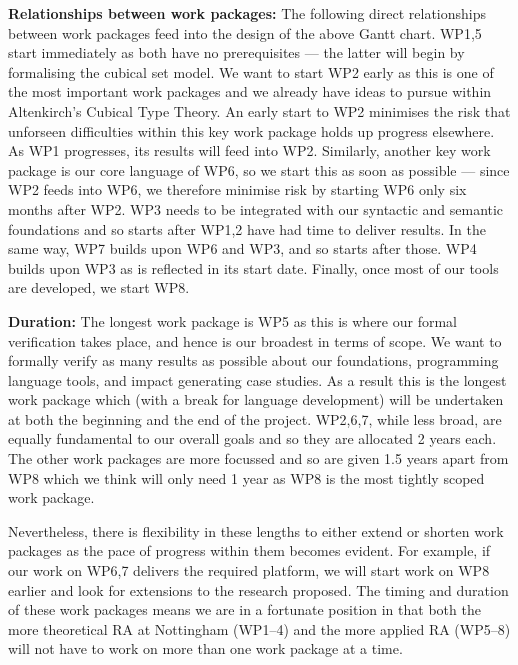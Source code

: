 \documentclass[a4paper,11pt]{article}
\begin{document}
\bigskip

{\bf Relationships between work packages:} The following direct
relationships between work packages feed into the design of the above
Gantt chart. WP1,5 start immediately as both have no prerequisites ---
the latter will begin by formalising the cubical set model. We want to
start WP2 early as this is one of the most important work packages and
we already have ideas to pursue within Altenkirch's Cubical Type
Theory. An early start to WP2 minimises the risk that unforseen
difficulties within this key work package holds
up progress elsewhere. As WP1 progresses, its results
will feed into WP2. Similarly, another key work package is our core
language of WP6, so we start this as soon as possible --- since WP2 feeds
into WP6, we therefore minimise risk by starting WP6 only six months after WP2. WP3 needs to be integrated with our syntactic
and semantic foundations and so starts after WP1,2 have had time to
deliver results.
In the same way, WP7 builds upon WP6 and WP3, and so starts
after those. %
WP4 builds upon WP3 as is reflected in
its start date. Finally, once most of our tools are developed, we
start WP8.  

{\bf Duration:} The longest work package is WP5 as this is where our
formal verification takes place, and hence is our broadest in terms of
scope. We want to formally verify as many results as possible about
our foundations, programming language tools, and impact generating
case studies.  As a result this is the longest work package which
(with a break for language development) will be undertaken at both the
beginning and the end of the project. WP2,6,7, while less broad, are
equally fundamental to our overall goals and so they are allocated 2
years each. The other work packages are more focussed and
so are given 1.5 years apart from WP8 which we think will only need 1
year as WP8 is the most tightly scoped work package.

Nevertheless, there is flexibility in these lengths to either extend
or shorten work packages as the pace of progress within them becomes
evident. For example, if our work on WP6,7 delivers the required
platform, we will start work on WP8 earlier and look for extensions
to the research proposed. The timing and duration of these work
packages means we are in a fortunate position in that both the more
theoretical RA at Nottingham (WP1--4) and the more applied RA (WP5--8)
will not have to work on more than one work package at a time.
\end{document}
